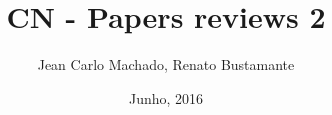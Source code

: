 \usepackage{graphicx}
\usepackage[utf8]{inputenc}
\title{CN - Papers reviews 2}
\author{Jean Carlo Machado, Renato Bustamante}
\date{Junho, 2016}
\usepackage[overlay,absolute]{textpos}
\usepackage{ragged2e}
\justifying
{}
\geometry{paperwidth=140mm,paperheight=105mm}

